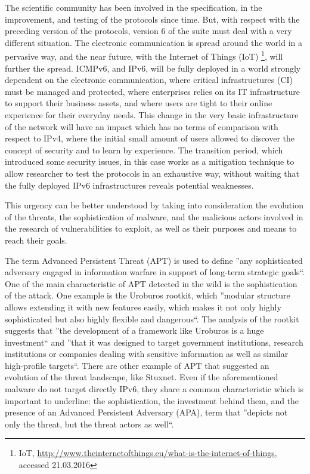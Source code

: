 \documentclass[12pt]{article}
\begin{document}
The scientific community has been involved in the specification, in the improvement, and testing of the protocols since time. But, with respect with the preceding version of the protocols, version 6 of the suite must deal with a very different situation. The electronic communication is spread around the world in a pervasive way, and the near future, with the Internet of Things (IoT) \footnote{IoT, \url{http://www.theinternetofthings.eu/what-is-the-internet-of-things}, accessed 21.03.2016}, will further the spread. ICMPv6, and IPv6, will be fully deployed in a world strongly dependent on the electronic communication, where critical infrastructures (CI) must be managed and protected, where enterprises relies on its IT infrastructure to support their business assets, and where users are tight to their online experience for their everyday needs. This change in the very basic infrastructure of the network will have an impact which has no terms of comparison with respect to IPv4, where the initial small amount of users allowed to discover the concept of security and to learn by experience. The transition period, which introduced some security issues, in this case works as a mitigation technique to allow researcher to test the protocols in an exhaustive way, without waiting that the fully deployed IPv6 infrastructures reveals potential weaknesses.

This urgency can be better understood by taking into consideration the evolution of the threats, the sophistication of malware, and the malicious actors involved in the research of vulnerabilities to exploit, as well as their purposes and means to reach their goals.

The term Advanced Persistent Threat (APT) is used to define ''any sophisticated adversary engaged in information warfare in support of long-term strategic goals``\cite{apt}. One of the main characteristic of APT detected in the wild is the sophistication of the attack. One example is the Uroburos rootkit\cite{uroburos}, which ''modular structure allows extending it with new features easily, which makes it not only highly sophisticated but also highly flexible and dangerous``. The analysis of the rootkit suggests that ''the development of a framework like Uroburos is a huge investment`` and ''that it was designed to target government institutions, research institutions or companies dealing with sensitive information as well as similar high-profile targets``. There are other example of APT that suggested an evolution of the threat landscape, like Stuxnet\cite{stuxnet}. Even if the aforementioned malware do not target directly IPv6, they share a common characteristic which is important to underline: the sophistication, the investment behind them, and the presence of an Advanced Persistent Adversary (APA)\cite{apa}, term that ''depicts not only the threat, but the threat actors as well``.
\end{document}

